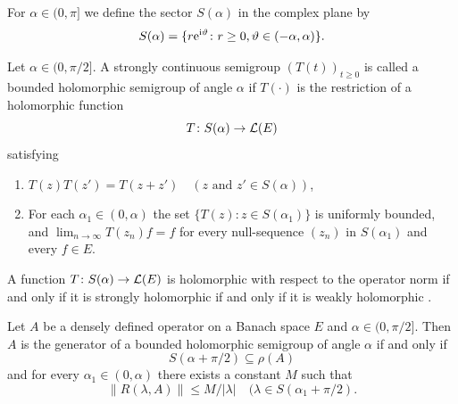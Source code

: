 For $\alpha \in (0,\pi]$ we define the sector $S(\alpha)$ in the complex plane by
\[
    S(\alpha) = \{r\eu^{\im\theta} \colon r \geq 0, \theta \in (-\alpha,\alpha)\} .
\]
\begin{definition}\label{def:a2-1.11}
Let $\alpha \in (0,\pi/2]$.
A strongly continuous semigroup $(T(t))_{t \geq 0}$ is called a bounded holomorphic semigroup of angle $\alpha$ if\/ $T(\cdot)$ is the restriction of a holomorphic function
\[
    T \colon S(\alpha) \to \mathcal{L}(E)
\]
satisfying
\begin{enumerate}[\upshape(i), wide, labelindent=.25em]

\item
$T(z)T(z') = T(z+z') \quad (z \text{ and } z' \in S(\alpha))$,

\item
For each  $ \alpha_{1} \in (0,\alpha) $  the set   
$ \{ T(z) \colon z \in S(\alpha_{1}) \} $
is uniformly bounded, and  
$\lim_{n \to \infty} T(z_{n})f = f$ 
for every null-sequence  $(z_{n})$ 
in  $ S( \alpha_{1} ) $  and every   $f \in E$.

\end{enumerate}
\end{definition}
\begin{remark*}\label{rem:a2-1.5-kgk}
A function $T \colon S(\alpha) \to \mathcal{L}(E)$ is holomorphic with respect to the operator norm if and only if it is strongly holomorphic if and only if it is weakly holomorphic \textcite[V.3]{yosida:1965}.
\end{remark*}
\begin{theorem}\label{thm:a2-1.12}
Let $A$ be a densely defined operator on a Banach space $E$ and $\alpha \in (0,\pi/2]$.
Then $A$ is the generator of a bounded holomorphic semigroup of angle $\alpha$ if and only if 
\[
S(\alpha + \pi/2) \subseteq \rho(A)
\]
and for every $\alpha_{1} \in (0,\alpha)$ there exists a constant $M$ such that
\begin{equation}\label{eq:a2-1.6}
    \|R(\lambda,A)\| \leq M/|\lambda| \quad (\lambda \in S(\alpha_{1} + \pi/2). 
\end{equation}
\end{theorem}
